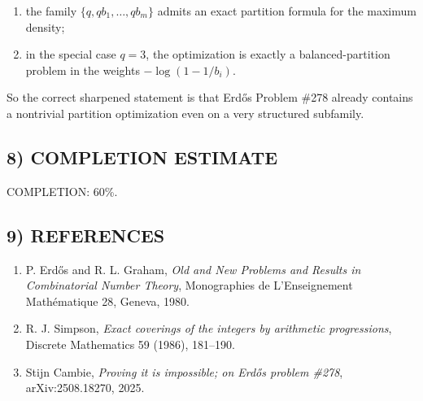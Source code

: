 \begin{enumerate}
\item the family $\{q,qb_1,\dots,qb_m\}$ admits an exact partition formula for the maximum density;
\item in the special case $q=3$, the optimization is exactly a balanced-partition problem in the weights $-\log(1-1/b_i)$.
\end{enumerate}

So the correct sharpened statement is that Erd\H{o}s Problem \#278 already contains a nontrivial partition optimization even on a very structured subfamily.

\subsection*{8) COMPLETION ESTIMATE}

COMPLETION: 60\%.

\subsection*{9) REFERENCES}

\begin{enumerate}
\item P. Erd\H{o}s and R. L. Graham, \emph{Old and New Problems and Results in Combinatorial Number Theory}, Monographies de L'Enseignement Math\'ematique 28, Geneva, 1980.
\item R. J. Simpson, \emph{Exact coverings of the integers by arithmetic progressions}, Discrete Mathematics 59 (1986), 181--190.
\item Stijn Cambie, \emph{Proving it is impossible; on Erd\H{o}s problem \#278}, arXiv:2508.18270, 2025.
\end{enumerate}

